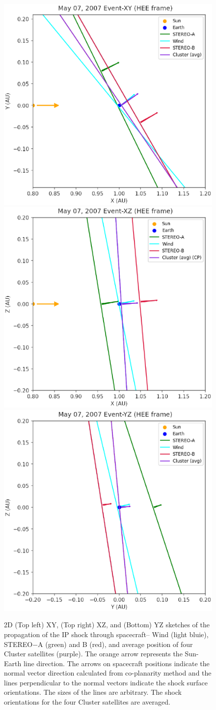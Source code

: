 \documentclass[draft]{agujournal2019}
\begin{document}
\begin{figure}
\includegraphics[width=.35\linewidth]{jgr-2023-ipshocks-f15a.eps}
\includegraphics[width=.35\linewidth]{jgr-2023-ipshocks-f15b.eps}
\includegraphics[width=.35\linewidth]{jgr-2023-ipshocks-f15c.eps}
\caption{2D (Top left) XY, (Top right) XZ, and (Bottom) YZ sketches of the propagation of the IP shock through spacecraft-- Wind (light bluie), STEREO$-$A (green) and B (red), and average position of four Cluster satellites (purple). The orange arrow represents the Sun-Earth line direction. The arrows on spacecraft positions indicate the normal vector direction calculated from co-planarity method and the lines perpendicular to the normal vectors indicate the shock surface orientations. The sizes of the lines are arbitrary. The shock orientations for the four Cluster satellites are averaged.\label{fig:05072D}}
\end{figure}

\pagebreak

\end{document}
